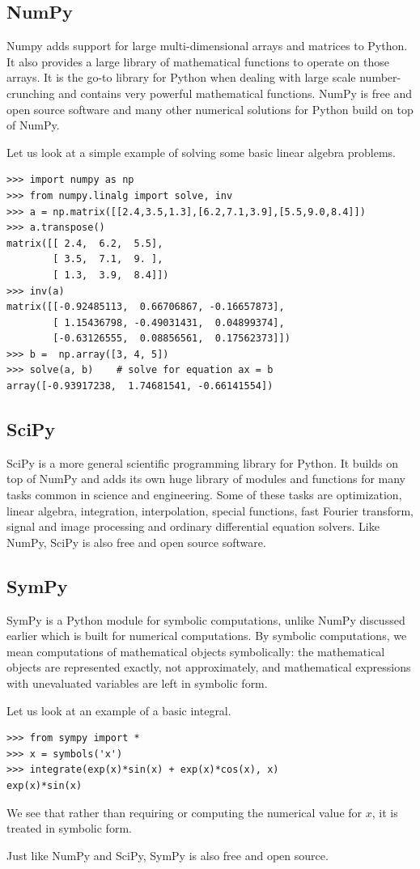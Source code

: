 \subsection{NumPy}
Numpy \cite{numpy} adds support for large multi-dimensional arrays and matrices to Python. It also provides a large library of mathematical functions to operate on those arrays. It is the go-to library for Python when dealing with large scale number-crunching and contains very powerful mathematical functions. NumPy is free and open source software and many other numerical solutions for Python build on top of NumPy.
\par Let us look at a simple example of solving some basic linear algebra problems.
\begin{verbatim}
>>> import numpy as np
>>> from numpy.linalg import solve, inv
>>> a = np.matrix([[2.4,3.5,1.3],[6.2,7.1,3.9],[5.5,9.0,8.4]])
>>> a.transpose()
matrix([[ 2.4,  6.2,  5.5],
        [ 3.5,  7.1,  9. ],
        [ 1.3,  3.9,  8.4]])
>>> inv(a)
matrix([[-0.92485113,  0.66706867, -0.16657873],
        [ 1.15436798, -0.49031431,  0.04899374],
        [-0.63126555,  0.08856561,  0.17562373]])
>>> b =  np.array([3, 4, 5])
>>> solve(a, b)    # solve for equation ax = b
array([-0.93917238,  1.74681541, -0.66141554])
\end{verbatim}

\subsection{SciPy}
SciPy \cite{scipy} is a more general scientific programming library for Python. It builds on top of NumPy and adds its own huge library of modules and functions for many tasks common in science and engineering. Some of these tasks are optimization, linear algebra, integration, interpolation, special functions, fast Fourier transform, signal and image processing and ordinary differential equation solvers. Like NumPy, SciPy is also free and open source software.

\subsection{SymPy}
SymPy \cite{sympy} is a Python module for symbolic computations, unlike NumPy discussed earlier which is built for numerical computations. By symbolic computations, we mean computations of mathematical objects symbolically: the mathematical objects are represented exactly, not approximately, and mathematical expressions with unevaluated variables are left in symbolic form.
\par Let us look at an example of a basic integral.
\begin{verbatim}
>>> from sympy import *
>>> x = symbols('x')
>>> integrate(exp(x)*sin(x) + exp(x)*cos(x), x)
exp(x)*sin(x)
\end{verbatim}
We see that rather than requiring or computing the numerical value for $x$, it is treated in symbolic form.
\par Just like NumPy and SciPy, SymPy is also free and open source.

